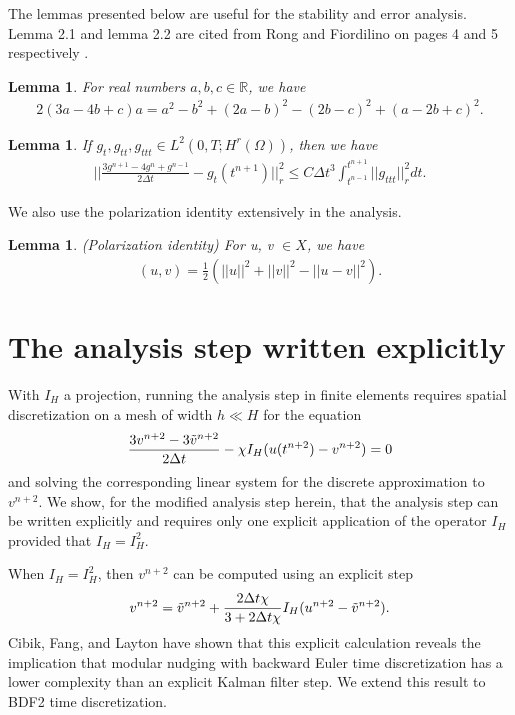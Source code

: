 \documentclass[11pt,a4paper]{article}
\newtheorem{lemma}[theorem]{Lemma}
\begin{document}
The lemmas presented below are useful for the stability and error analysis. Lemma 2.1 and lemma 2.2 are cited from Rong and Fiordilino on pages 4 and 5 respectively \cite{Rong:2018}.
\begin{lemma}
    For real numbers $a,b,c\in \mathbb{R}$, we have 
    \begin{align}
        2(3a-4b+c)a=a^2-b^2+(2a-b)^2-(2b-c)^2+(a-2b+c)^2.
    \end{align}
\end{lemma}

\begin{lemma}
    If $g_t, g_{tt}, g_{ttt} \in L^2(0, T; H^r(\Omega))$, then we have
    \begin{align}
        \Bigg|\Bigg|\frac{3g^{n+1}-4g^n+g^{n-1}}{2\Delta t}-g_t(t^{n+1})\Bigg|\Bigg|_r^2\leq C \Delta t^3 \int_{t^{n-1}}^{t^{n+1}}||g_{ttt}||_r^2 dt.
    \end{align}
\end{lemma}

We also use the polarization identity extensively in the analysis.
\begin{lemma}{(Polarization identity)}
    For u, v $\in X$, we have 
    \begin{align}
        (u,v)=\frac{1}{2}(||u||^2+||v||^2-||u-v||^2).
    \end{align}
\end{lemma}

\section{The analysis step written explicitly}

With $I_H$ a projection, running the analysis step in finite elements requires spatial discretization on a mesh of width $h\ll H$ for the equation
\begin{align}
    \frac{3v^{n+2}-3\Tilde{v}^{n+2}}{2\Delta t}-\chi I_H(u(t^{n+2})-v^{n+2})=0
\end{align}
and solving the corresponding linear system for the discrete approximation to $v^{n+2}$. We show, for the modified analysis step herein, that the analysis step can be written explicitly and requires only one explicit application of the operator $I_H$ provided that $I_H=I_H^2$.

When $I_H=I_H^2$, then $v^{n+2}$ can be computed using an explicit step
\begin{align}
    v^{n+2}=\Tilde{v}^{n+2}+\frac{2\Delta t\chi}{3+2\Delta t\chi}I_H(u^{n+2}-\Tilde{v}^{n+2}).
\end{align}
Cibik, Fang, and Layton \cite{Fang:2025} have shown that this explicit calculation reveals the implication that modular nudging with backward Euler time discretization has a lower complexity than an explicit Kalman filter step. We extend this result to BDF2 time discretization.
\end{document}
